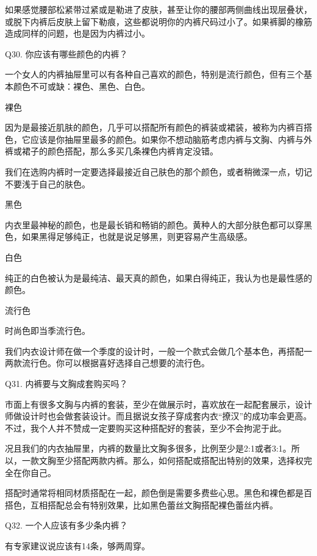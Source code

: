 \documentclass[12pt,UTF8]{ctexbook}
\begin{document}
如果感觉腰部松紧带过紧或是勒进了皮肤，甚至让你的腰部两侧曲线出现层叠状，或脱下内裤后皮肤上留下勒痕，这些都说明你的内裤尺码过小了。如果裤脚的橡筋造成同样的问题，也是因为内裤过小。





Q30. 你应该有哪些颜色的内裤？


一个女人的内裤抽屉里可以有各种自己喜欢的颜色，特别是流行颜色，但有三个基本颜色不可或缺：裸色、黑色、白色。

裸色

因为是最接近肌肤的颜色，几乎可以搭配所有颜色的裤装或裙装，被称为内裤百搭色，它应该是你抽屉里最多的颜色。如果你不想动脑筋考虑内裤与文胸、内裤与外裤或裙子的颜色搭配，那么多买几条裸色内裤肯定没错。

我们在选购内裤时一定要选择最接近自己肤色的那个颜色，或者稍微深一点，切记不要浅于自己的肤色。

黑色

内衣里最神秘的颜色，也是最长销和畅销的颜色。黄种人的大部分肤色都可以穿黑色，如果黑得足够纯正，也就是说足够黑，则更容易产生高级感。

白色

纯正的白色被认为是最纯洁、最天真的颜色，如果白得纯正，我认为也是最性感的颜色。

流行色

时尚色即当季流行色。

我们内衣设计师在做一个季度的设计时，一般一个款式会做几个基本色，再搭配一两款流行色。你可以根据喜好选择自己想要的流行色。





Q31. 内裤要与文胸成套购买吗？


市面上有很多文胸与内裤的套装，至少在做展示时，喜欢放在一起配套展示，设计师做设计时也会做套装设计。而且据说女孩子穿成套内衣“撩汉”的成功率会更高。不过，我个人并不赞成一定要购买这种搭配好的套装，至少不会拘泥于此。

况且我们的内衣抽屉里，内裤的数量比文胸多很多，比例至少是2:1或者3:1。所以，一款文胸至少搭配两款内裤。那么，如何搭配或搭配出特别的效果，选择权完全在你自己。


搭配时通常将相同材质搭配在一起，颜色倒是需要多费些心思。黑色和裸色都是百搭色，互相搭配总会有特别效果，比如黑色蕾丝文胸搭配裸色蕾丝内裤。





Q32. 一个人应该有多少条内裤？


有专家建议说应该有14条，够两周穿。
\end{document}
